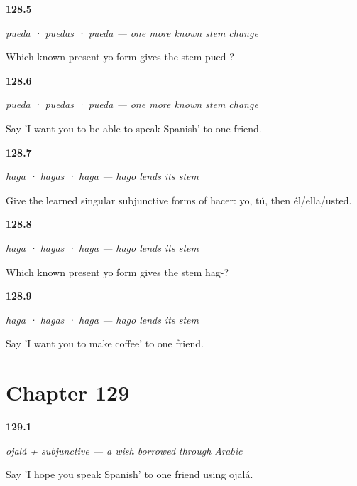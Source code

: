 \noindent\begin{minipage}[t]{\linewidth}
\raggedright
\hypertarget{review-ES-C18-poder-subjuntivo-stem}{\textbf{128.5}} \emph{pueda · puedas · pueda — one more known stem change}\par
\small Which known present yo form gives the stem pued-?
\end{minipage}\par\medskip

\noindent\begin{minipage}[t]{\linewidth}
\raggedright
\hypertarget{review-ES-C18-poder-subjuntivo-wanted}{\textbf{128.6}} \emph{pueda · puedas · pueda — one more known stem change}\par
\small Say 'I want you to be able to speak Spanish' to one friend.
\end{minipage}\par\medskip

\noindent\begin{minipage}[t]{\linewidth}
\raggedright
\hypertarget{review-ES-C18-hacer-subjuntivo-forms}{\textbf{128.7}} \emph{haga · hagas · haga — hago lends its stem}\par
\small Give the learned singular subjunctive forms of hacer: yo, tú, then él/ella/usted.
\end{minipage}\par\medskip

\noindent\begin{minipage}[t]{\linewidth}
\raggedright
\hypertarget{review-ES-C18-hacer-subjuntivo-stem}{\textbf{128.8}} \emph{haga · hagas · haga — hago lends its stem}\par
\small Which known present yo form gives the stem hag-?
\end{minipage}\par\medskip

\noindent\begin{minipage}[t]{\linewidth}
\raggedright
\hypertarget{review-ES-C18-hacer-subjuntivo-wanted}{\textbf{128.9}} \emph{haga · hagas · haga — hago lends its stem}\par
\small Say 'I want you to make coffee' to one friend.
\end{minipage}\par\medskip

\section*{Chapter 129}

\noindent\begin{minipage}[t]{\linewidth}
\raggedright
\hypertarget{review-ES-C18-ojala-trigger}{\textbf{129.1}} \emph{ojalá + subjunctive — a wish borrowed through Arabic}\par
\small Say 'I hope you speak Spanish' to one friend using ojalá.
\end{minipage}\par\medskip

